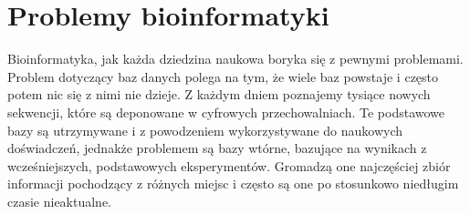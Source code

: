 

\section{Problemy bioinformatyki}
Bioinformatyka, jak każda dziedzina naukowa boryka się z pewnymi problemami. Problem dotyczący baz danych polega na tym, że wiele baz powstaje i często potem nic się z nimi nie dzieje. Z każdym dniem poznajemy tysiące nowych sekwencji, które są deponowane w cyfrowych przechowalniach. Te podstawowe bazy są utrzymywane i z powodzeniem wykorzystywane do naukowych doświadczeń, jednakże problemem są bazy wtórne, bazujące na wynikach z wcześniejszych, podstawowych eksperymentów. Gromadzą one najczęściej zbiór informacji pochodzący z różnych miejsc i często są one po stosunkowo niedługim czasie nieaktualne.

